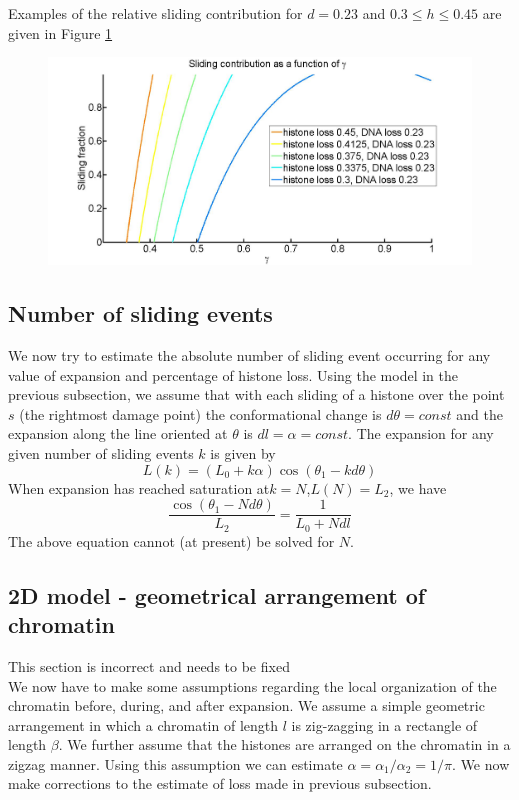 \documentclass[12pt]{report}
\begin{document}
 Examples of the relative sliding contribution for $ d=0.23$ and $0.3\leq h\leq 0.45$ are given in Figure \ref{fig:relativeSlidingContribution}
  
\begin{figure}[H]
\centering
\includegraphics[width=0.5\linewidth, height=0.3\textheight]{../../documents/report/Images/SlidingModel/relativeSlidingContribution}
\caption{}
\label{fig:relativeSlidingContribution}
\end{figure}

\subsection{Number of sliding events}
We now try to estimate the absolute number of sliding event occurring for any value of expansion and percentage of histone loss. Using the model in the previous subsection, we assume that with each sliding of a histone over the point $s$ (the rightmost damage point) the conformational change is $d\theta=const$ and the expansion along the line oriented at $\theta$ is $dl=\alpha=const$.
The expansion for any given number of sliding events $k$ is given by 
\begin{equation*}
L(k) = (L_0+k\alpha)\cos(\theta_1 -kd\theta)
\end{equation*}
When expansion has reached saturation at$k=N$,$L(N) = L_2$, we have 
\begin{equation*}
\frac{\cos(\theta_1 -Nd\theta)}{L_2} = \frac{1}{L_0+Ndl}
\end{equation*}
The above equation cannot (at present) be solved for $N$. 


\subsection{2D model - geometrical arrangement of chromatin}\label{subsection:2dModelGeometricalArrangement}
This section is incorrect and needs to be fixed
\\
We now have to make some assumptions regarding the local organization of the chromatin before, during, and after expansion. 
We assume a simple geometric arrangement in which a chromatin of length $l$ is zig-zagging in a rectangle of length $\beta$.
We further assume that the histones are arranged on the chromatin in a zigzag manner. Using this assumption we can estimate $\alpha = \alpha_1/\alpha_2 = 1/\pi$. 
We now make corrections to the estimate of loss made in previous subsection. 
\end{document}
